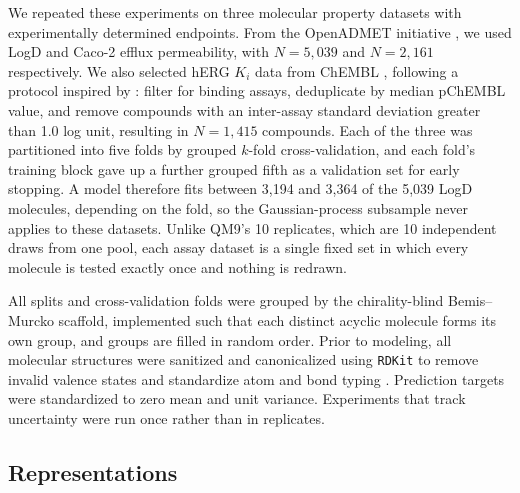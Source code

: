We repeated these experiments on three molecular property datasets with experimentally determined endpoints. From the OpenADMET initiative \citep{openadmet}, we used LogD and Caco-2 efflux permeability, with $N = 5{,}039$ and $N = 2{,}161$ respectively. We also selected hERG $K_i$ data from ChEMBL \citep{Zdrazil2023}, following a protocol inspired by \citet{landrum2024}: filter for binding assays, deduplicate by median pChEMBL value, and remove compounds with an inter-assay standard deviation greater than 1.0 log unit, resulting in $N = 1{,}415$ compounds. Each of the three was partitioned into five folds by grouped $k$-fold cross-validation, and each fold's training block gave up a further grouped fifth as a validation set for early stopping. A model therefore fits between 3,194 and 3,364 of the 5,039 LogD molecules, depending on the fold, so the Gaussian-process subsample never applies to these datasets. Unlike QM9's 10 replicates, which are 10 independent draws from one pool, each assay dataset is a single fixed set in which every molecule is tested exactly once and nothing is redrawn.

All splits and cross-validation folds were grouped by the chirality-blind Bemis--Murcko scaffold, implemented such that each distinct acyclic molecule forms its own group, and groups are filled in random order. Prior to modeling, all molecular structures were sanitized and canonicalized using \texttt{RDKit} to remove invalid valence states and standardize atom and bond typing \citep{rdkit}. Prediction targets were standardized to zero mean and unit variance. Experiments that track uncertainty were run once rather than in replicates.

\subsection{Representations}

